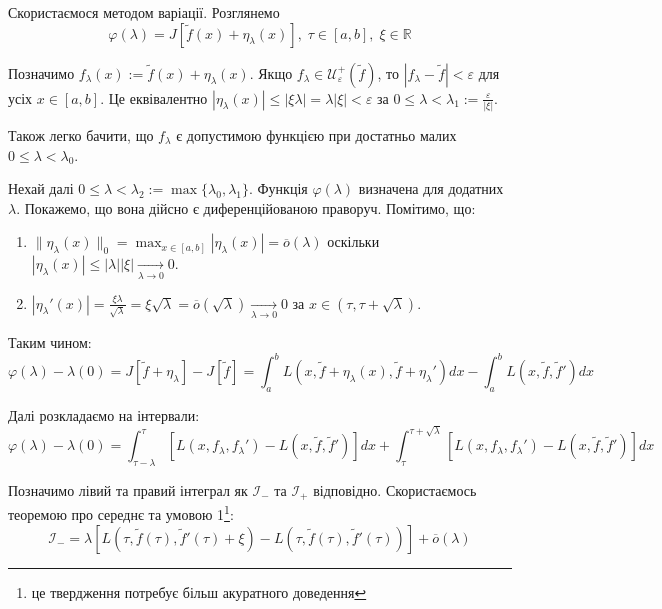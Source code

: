 \documentclass[14pt]{extarticle}
\newcommand{\<}{\langle}
\renewcommand{\>}{\rangle}
\theoremstyle{mystyle}{\newtheorem{definition}{Definition}[section]}
\theoremstyle{mystyle}{\newtheorem{proposition}[definition]{Proposition}}
\theoremstyle{mystyle}{\newtheorem{theorem}[definition]{Theorem}}
\theoremstyle{mystyle}{\newtheorem{lemma}[definition]{Lemma}}
\theoremstyle{mystyle}{\newtheorem{corollary}[definition]{Corollary}}
\theoremstyle{mystyle}{\newtheorem*{remark}{Remark}}
\theoremstyle{mystyle}{\newtheorem*{remarks}{Remarks}}
\theoremstyle{mystyle}{\newtheorem*{example}{Example}}
\theoremstyle{mystyle}{\newtheorem*{examples}{Examples}}
\theoremstyle{definition}{\newtheorem*{exercise}{Exercise}}
\theoremstyle{cstyle}{\newtheorem*{cthm}{}}
\theoremstyle{warn}
\begin{document}
Скористаємося методом варіації. Розглянемо
\begin{equation}
    \varphi(\lambda) = J[\widetilde{f}(x)+\eta_{\lambda}(x)], \; \tau \in [a,b], \; \xi \in \mathbb{R}
\end{equation}

Позначимо $f_{\lambda}(x) := \widetilde{f}(x) + \eta_{\lambda}(x)$. Якщо $f_{\lambda} \in \mathcal{U}_{\varepsilon}^+(\widetilde{f})$, то $|f_{\lambda}-\widetilde{f}|<\varepsilon$ для усіх $x \in [a,b]$.
Це еквівалентно $|\eta_{\lambda}(x)| \leq |\xi\lambda|=\lambda|\xi|<\varepsilon$ за $0\leq\lambda<\lambda_1 := \frac{\varepsilon}{|\xi|}$.

Також легко бачити, що $f_{\lambda}$ є допустимою функцією при достатньо малих $0\leq\lambda<\lambda_0$.

Нехай далі $0\leq\lambda<\lambda_2 := \max\{\lambda_0,\lambda_1\}$. Функція $\varphi(\lambda)$ визначена для додатних $\lambda$. Покажемо, що вона дійсно є диференційованою праворуч. Помітимо, що:
\begin{enumerate}
    \item $\|\eta_{\lambda}(x)\|_0 = \max_{x \in [a,b]}|\eta_{\lambda}(x)|=\overline{o}(\lambda)$ оскільки $|\eta_{\lambda}(x)| \leq |\lambda||\xi| \xrightarrow[\lambda \to 0]{}0$.
    \item $|\eta_{\lambda}'(x)|=\frac{\xi\lambda}{\sqrt{\lambda}}=\xi\sqrt{\lambda} = \overline{o}(\sqrt{\lambda}) \xrightarrow[\lambda \to 0]{}0$ за $x \in (\tau,\tau+\sqrt{\lambda})$.
\end{enumerate}

Таким чином:
\begin{equation}
    \varphi(\lambda)-\lambda(0) = J[\widetilde{f}+\eta_{\lambda}]-J[\widetilde{f}] = \int_a^b L(x,\widetilde{f}+\eta_{\lambda}(x),\widetilde{f}+\eta_{\lambda}')dx - \int_a^b L(x,\widetilde{f},\widetilde{f}')dx
\end{equation}

Далі розкладаємо на інтервали:
\begin{equation}
    \varphi(\lambda)-\lambda(0) = \int_{\tau-\lambda}^{\tau}[L(x,f_{\lambda},f_{\lambda}')-L(x,\widetilde{f},\widetilde{f}')]dx + \int_{\tau}^{\tau+\sqrt{\lambda}}[L(x,f_{\lambda},f_{\lambda}')-L(x,\widetilde{f},\widetilde{f}')]dx 
\end{equation}

Позначимо лівий та правий інтеграл як $\mathcal{I}_-$ та $\mathcal{I}_+$ відповідно. Скористаємось теоремою про середнє та умовою 1\footnote{це твердження потребує більш акуратного доведення}:
\begin{equation}
    \mathcal{I}_- = \lambda[L(\tau,\widetilde{f}(\tau),\widetilde{f}'(\tau)+\xi)-L(\tau,\widetilde{f}(\tau),\widetilde{f}'(\tau))] + \overline{o}(\lambda)
\end{equation}
\end{document}
